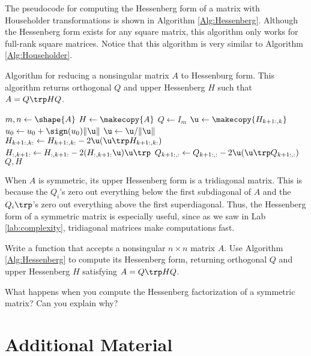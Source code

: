 The pseudocode for computing the Hessenberg form of a matrix with Householder transformations is shown in Algorithm \ref{Alg:Hessenberg}.
Although the Hessenberg form exists for any square matrix, this algorithm only works for full-rank square matrices.
Notice that this algorithm is very similar to Algorithm \ref{Alg:Householder}.

\begin{algorithm}
\caption{Algorithm for reducing a nonsingular matrix $A$ to Hessenburg form.
This algorithm returns orthogonal $Q$ and upper Hessenberg $H$ such that $A = Q\trp HQ$.}
\label{Alg:Hessenberg}
\begin{algorithmic}[1]
    \State $m, n \gets \shape{A}$
    \State $H \gets \makecopy{A}$
    \State $Q \gets I_{m}$
        \State $\u \gets \makecopy{H_{k+1:,k}}$
        \State $u_0 \gets u_0 + \sign(u_0)\|\u\|$
        \State $\u \gets \u/\|\u\|$
        \State $H_{k+1:,k:} \gets H_{k+1:,k:} - 2\u(\u\trp H_{k+1:,k:})$
        \State $H_{:,k+1:} \gets H_{:,k+1:} - 2(H_{:,k+1:} \u) \u\trp$
        \State $Q_{k+1:,:} \gets Q_{k+1:,:} - 2\u(\u\trp Q_{k+1:,:})$
    \EndFor
    \State {} $Q, H$
\EndProcedure
\end{algorithmic}
\end{algorithm}

When $A$ is symmetric, its upper Hessenberg form is a tridiagonal matrix.
This is because the $Q_i$'s zero out everything below the first subdiagonal of $A$ and the $Q_i\trp$'s zero out everything above the first superdiagonal.
Thus, the Hessenberg form of a symmetric matrix is especially useful, since as we saw in Lab \ref{lab:complexity}, tridiagonal matrices make computations fast.

\begin{problem} %
Write a function that accepts a nonsingular $n \times n$ matrix $A$.
Use Algorithm \ref{Alg:Hessenberg} to compute its Hessenberg form, returning orthogonal $Q$ and upper Hessenberg $H$ satisfying $A = Q\trp HQ$.
\end{problem}

What happens when you compute the Hessenberg factorization of a symmetric matrix?
Can you explain why?

\newpage

\section*{Additional Material} %

